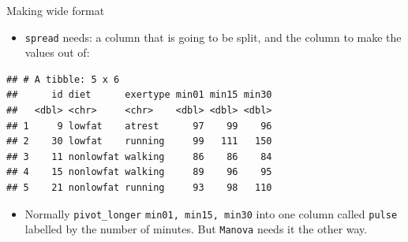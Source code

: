 \documentclass[
  ignorenonframetext,
]{beamer}
\newenvironment{Shaded}{\begin{snugshade}}{\end{snugshade}}
\newcommand{\DataTypeTok}[1]{\textcolor[rgb]{0.13,0.29,0.53}{#1}}
\newcommand{\DecValTok}[1]{\textcolor[rgb]{0.00,0.00,0.81}{#1}}
\newcommand{\KeywordTok}[1]{\textcolor[rgb]{0.13,0.29,0.53}{\textbf{#1}}}
\newcommand{\NormalTok}[1]{#1}
\newcommand{\OperatorTok}[1]{\textcolor[rgb]{0.81,0.36,0.00}{\textbf{#1}}}
\newcommand{\StringTok}[1]{\textcolor[rgb]{0.31,0.60,0.02}{#1}}
\providecommand{\tightlist}{%
  \setlength{\itemsep}{0pt}\setlength{\parskip}{0pt}}
\begin{document}
\begin{frame}[fragile]{Making wide format}
\protect\hypertarget{making-wide-format}{}

\begin{itemize}
\tightlist
\item
  \texttt{spread} needs: a column that is going to be split, and the
  column to make the values out of:
\end{itemize}

\footnotesize

\begin{Shaded}
\end{Shaded}

\begin{verbatim}
## # A tibble: 5 x 6
##      id diet      exertype min01 min15 min30
##   <dbl> <chr>     <chr>    <dbl> <dbl> <dbl>
## 1     9 lowfat    atrest      97    99    96
## 2    30 lowfat    running     99   111   150
## 3    11 nonlowfat walking     86    86    84
## 4    15 nonlowfat walking     89    96    95
## 5    21 nonlowfat running     93    98   110
\end{verbatim}

\normalsize

\begin{itemize}
\tightlist
\item
  Normally \texttt{pivot\_longer} \texttt{min01, min15,
  min30} into one column called \texttt{pulse} labelled by the number of
  minutes. But \texttt{Manova} needs it the other way.
\end{itemize}

\end{frame}
\end{document}
